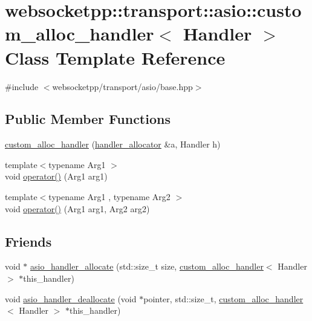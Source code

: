 \hypertarget{classwebsocketpp_1_1transport_1_1asio_1_1custom__alloc__handler}{}\section{websocketpp\+:\+:transport\+:\+:asio\+:\+:custom\+\_\+alloc\+\_\+handler$<$ Handler $>$ Class Template Reference}
\label{classwebsocketpp_1_1transport_1_1asio_1_1custom__alloc__handler}


{\ttfamily \#include $<$websocketpp/transport/asio/base.\+hpp$>$}

\subsection*{Public Member Functions}
\begin{DoxyCompactItemize}
\item 
\hyperlink{classwebsocketpp_1_1transport_1_1asio_1_1custom__alloc__handler_ab1006c6d3c3016696dd52d7127ec7a98}{custom\+\_\+alloc\+\_\+handler} (\hyperlink{classwebsocketpp_1_1transport_1_1asio_1_1handler__allocator}{handler\+\_\+allocator} \&a, Handler h)
\item 
{\footnotesize template$<$typename Arg1 $>$ }\\void \hyperlink{classwebsocketpp_1_1transport_1_1asio_1_1custom__alloc__handler_af90b97d3323ff192385dae0eb29b8d0d}{operator()} (Arg1 arg1)
\item 
{\footnotesize template$<$typename Arg1 , typename Arg2 $>$ }\\void \hyperlink{classwebsocketpp_1_1transport_1_1asio_1_1custom__alloc__handler_a79f7e6c87d8f40890740ff4c8aa560c5}{operator()} (Arg1 arg1, Arg2 arg2)
\end{DoxyCompactItemize}
\subsection*{Friends}
\begin{DoxyCompactItemize}
\item 
void $\ast$ \hyperlink{classwebsocketpp_1_1transport_1_1asio_1_1custom__alloc__handler_a14dd8ffbfb3f9997911fd87b4b6e88d8}{asio\+\_\+handler\+\_\+allocate} (std\+::size\+\_\+t size, \hyperlink{classwebsocketpp_1_1transport_1_1asio_1_1custom__alloc__handler}{custom\+\_\+alloc\+\_\+handler}$<$ Handler $>$ $\ast$this\+\_\+handler)
\item 
void \hyperlink{classwebsocketpp_1_1transport_1_1asio_1_1custom__alloc__handler_a2157a4fc2f17712f09483a1b317dcf3f}{asio\+\_\+handler\+\_\+deallocate} (void $\ast$pointer, std\+::size\+\_\+t, \hyperlink{classwebsocketpp_1_1transport_1_1asio_1_1custom__alloc__handler}{custom\+\_\+alloc\+\_\+handler}$<$ Handler $>$ $\ast$this\+\_\+handler)
\end{DoxyCompactItemize}


